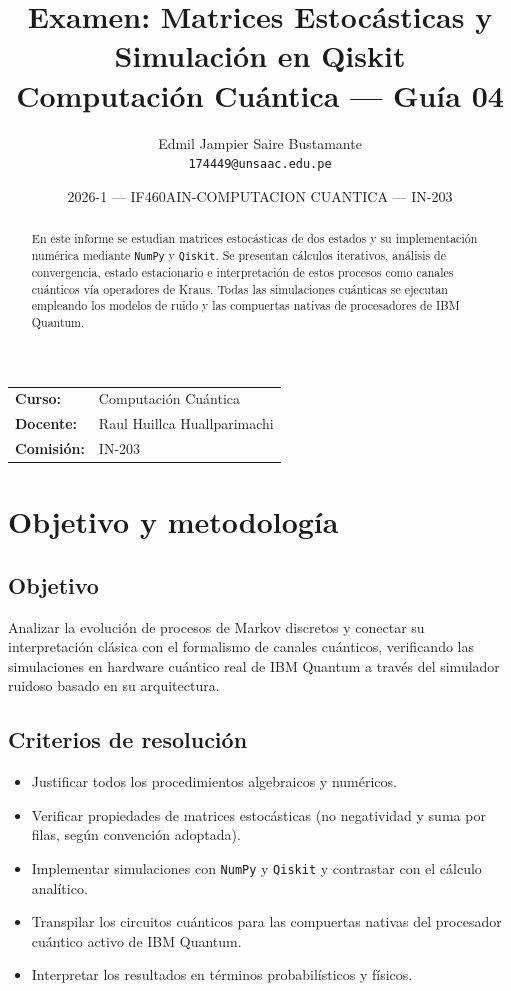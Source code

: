 \documentclass[12pt,a4paper]{article}
\title{\textbf{Examen: Matrices Estocásticas y Simulación en Qiskit}\\
\large Computación Cuántica --- Guía 04}
\author{Edmil Jampier Saire Bustamante\\
\texttt{174449@unsaac.edu.pe}}
\date{2026-1 --- IF460AIN-COMPUTACION CUANTICA --- IN-203}
\begin{document}
\maketitle
\thispagestyle{empty}

\begin{center}
\begin{tabular}{ll}
\textbf{Curso:} & Computación Cuántica \\
\textbf{Docente:} & Raul Huillca Huallparimachi \\
\textbf{Comisión:} & IN-203
\end{tabular}
\end{center}

\vspace{1em}

\begin{abstract}
En este informe se estudian matrices estocásticas de dos estados y su implementación
numérica mediante \texttt{NumPy} y \texttt{Qiskit}. Se presentan cálculos iterativos,
análisis de convergencia, estado estacionario e interpretación de estos procesos como
canales cuánticos vía operadores de Kraus. Todas las simulaciones cuánticas se ejecutan
empleando los modelos de ruido y las compuertas nativas de procesadores de IBM Quantum.
\end{abstract}

\tableofcontents
\newpage

\section{Objetivo y metodología}

\subsection{Objetivo}
Analizar la evolución de procesos de Markov discretos y conectar su interpretación
clásica con el formalismo de canales cuánticos, verificando las simulaciones en hardware cuántico real de IBM Quantum a través del simulador ruidoso basado en su arquitectura.

\subsection{Criterios de resolución}
\begin{itemize}
  \item Justificar todos los procedimientos algebraicos y numéricos.
  \item Verificar propiedades de matrices estocásticas (no negatividad y suma por filas, según convención adoptada).
  \item Implementar simulaciones con \texttt{NumPy} y \texttt{Qiskit} y contrastar con el cálculo analítico.
  \item Transpilar los circuitos cuánticos para las compuertas nativas del procesador cuántico activo de IBM Quantum.
  \item Interpretar los resultados en términos probabilísticos y físicos.
\end{itemize}
\end{document}
